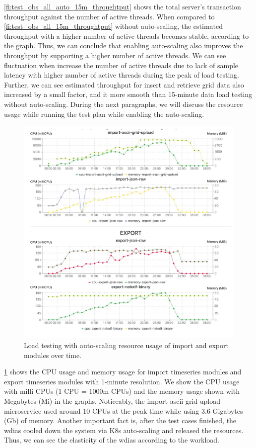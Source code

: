 \cref{fi:test_obs_all_auto_15m_throughtput} shows the total server's transaction throughput against the number of active threads. When compared to \cref{fi:test_obs_all_15m_throughtput} without auto-scaling, the estimated throughput with a higher number of active threads becomes stable, according to the graph. Thus, we can conclude that enabling auto-scaling also improves the throughput by supporting a higher number of active threads. We can see fluctuation when increase the number of active threads due to lack of sample latency with higher number of active threads during the peak of load testing. Further, we can see estimated throughput for insert and retrieve grid data also increased by a small factor, and it more smooth than 15-minute data load testing without auto-scaling. During the next paragraphs, we will discuss the resource usage while running the test plan while enabling the auto-scaling.

\begin{figure}[htp]
    \centering
    \includegraphics[width=1.0\textwidth]{results/obs/all_auto/obs_all_auto_15m_import_export_res.pdf}
    \caption{Load testing with auto-scaling resource usage of import and export modules over time.}
    \label{fi:obs_all_auto_15m_import_export_res}
\end{figure}

\cref{fi:obs_all_auto_15m_import_export_res} shows the CPU usage and memory usage for import timeseries modules and export timeseries modules with 1-minute resolution. We show the CPU usage with milli CPUs \cite{LinuxFoundationKubernetes:Containers} (1 CPU = 1000m CPUs) and the memory usage shown with Megabytes (Mi) \cite{LinuxFoundationKubernetes:Containers} in the graphs. Noticeably, the import-ascii-grid-upload microservice used around 10 CPUs at the peak time while using 3.6 Gigabytes (Gb) of memory. Another important fact is, after the test cases finished, the \acrshort{wdias} cooled down the system via K8s auto-scaling and released the resources. Thus, we can see the elasticity of the \acrshort{wdias} according to the workload.

